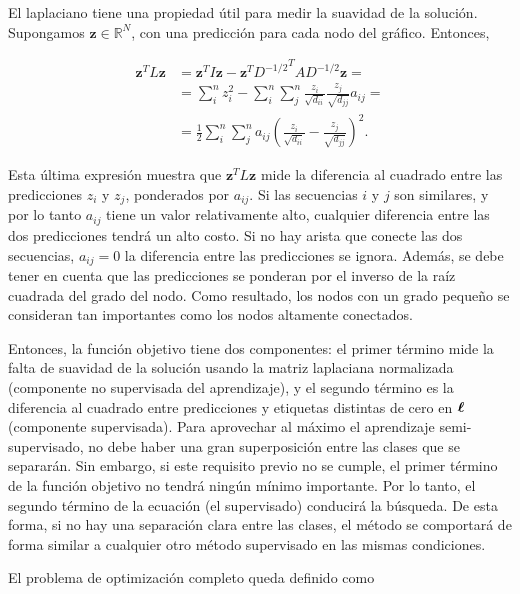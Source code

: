\noindent El laplaciano tiene una propiedad útil para medir la suavidad de la solución. Supongamos $\mathbf{z} \in \mathbb{R} ^ N$, con una predicción para cada nodo
del gráfico. Entonces,

\begin{equation}
	\begin{split}
		\mathbf{z}^T L \mathbf{z} & = \mathbf{z}^T I \mathbf{z} - \mathbf{z}^T {D^{-1/2}}^T A D^{-1/2} \mathbf{z} = \\
					  & = \sum_{i}^{n} z_{i}^{2} -  \sum_{i}^{n}  \sum_{j}^{n} \frac{z_{i}}{\sqrt{d_{ii}}} \frac{z_{j}}{\sqrt{d_{jj}}}
		a_{ij} = \\
		& = \frac{1}{2} \sum_{i}^{n} \sum_{j}^{n} a_{ij} \left(\frac{z_{i}}{ \sqrt{d_{ii}}} - \frac{z_{j}}{\sqrt{d_{jj}}}
	\right)^{2}.
\end{split}
\end{equation}

\noindent Esta última expresión muestra que $\mathbf {z} ^ T L \mathbf {z}$ mide la diferencia al cuadrado entre las predicciones $z_{i}$ y $z_{j}$, ponderados
por $a_{ij} $. Si las secuencias $ i $ y $ j $ son similares, y por lo tanto $ a_{ij} $ tiene un valor relativamente alto, cualquier diferencia entre las dos
predicciones tendrá un alto costo. Si no hay arista que conecte las dos secuencias, $a_{ij} = 0 $ la diferencia entre las predicciones se ignora. Además, se
debe tener en cuenta que las predicciones se ponderan por el inverso de la raíz cuadrada del grado del nodo. Como resultado, los nodos con un grado pequeño se
consideran tan importantes como los nodos altamente conectados.

Entonces, la función objetivo tiene dos componentes: el primer término mide la falta de suavidad de la solución usando la matriz laplaciana normalizada
(componente no supervisada del aprendizaje), y el segundo término es la diferencia al cuadrado entre predicciones y etiquetas distintas de cero en $\boldsymbol\ell$
(componente supervisada). Para aprovechar al máximo el aprendizaje semi-supervisado, no debe haber una gran superposición entre las clases que se separarán. Sin
embargo, si este requisito previo no se cumple, el primer término de la función objetivo no tendrá ningún mínimo importante. Por lo tanto, el segundo término de
la ecuación (el supervisado) conducirá la búsqueda. De esta forma, si no hay una separación clara entre las clases, el método se comportará de forma similar a
cualquier otro método supervisado en las mismas condiciones.

El problema de optimización completo queda definido como

